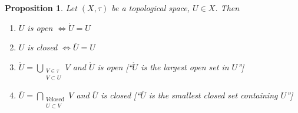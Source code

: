 \documentclass[a4paper]{article}
\newcounter{lecref}[section]
\numberwithin{lecref}{section}
\newtheorem{proposition}[lecref]{Proposition}
\begin{document}
\begin{proposition}
	\label{proposition:1.6}
	Let $(X, \tau)$ be a topological space, $U \in X$. Then
	\begin{enumerate}
		\item $U$ is open $\iff \mathring U = U$
		\item $U$ is closed $\iff \overline U = U$
		\item $\mathring U = \bigcup_{\substack{V \in \tau \\ V \subset U}} V$ and $\mathring U$ is open [\enquote{$\mathring U$ is the largest open set in $U$}]
		\item $\overline U = \bigcap_{\substack{V \text{closed} \\ U \subset V}} V$ and $\overline U$ is closed [\enquote{$\overline U$ is the smallest closed set containing $U$}]
	\end{enumerate}
\end{proposition}
\end{document}
